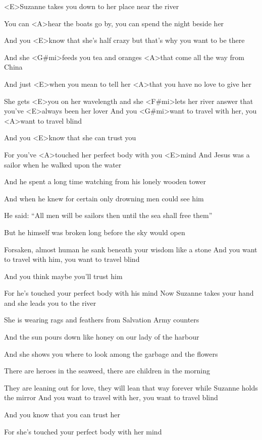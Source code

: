 
\zs
<E>Suzanne takes you down to her place near the river

You can <A>hear the boats go by, you can spend the night beside her

And you <E>know that she's half crazy but that's why you want to be there

And she <G#mi>feeds you tea and oranges <A>that come all the way from China

And just <E>when you mean to tell her <A>that you have no love to give her

She gets <E>you on her wavelength and she <F#mi>lets her river answer that you've <E>always been her lover
\ks
\zr
And you <G#mi>want to travel with her, you <A>want to travel blind

And you <E>know that she can trust you 

For you've <A>touched her perfect body with you <E>mind
\kr
\zs
And Jesus was a sailor when he walked upon the water

And he spent a long time watching from his lonely wooden tower

And when he knew for certain only drowning men could see him

He said: ``All men will be sailors then until the sea shall free them''

But he himself was broken long before the sky would open

Forsaken, almost human he sank beneath your wisdom like a stone
\ks
\zr
And you want to travel with him, you want to travel blind

And you think maybe you'll trust him

For he's touched your perfect body with his mind
\kr
\zs
Now Suzanne takes your hand and she leads you to the river

She is wearing rags and feathers from Salvation Army counters

And the sun pours down like honey on our lady of the harbour

And she shows you where to look among the garbage and the flowers

There are heroes in the seaweed, there are children in the morning

They are leaning out for love, they will lean that way forever while Suzanne holds the mirror
\ks
\zr
And you want to travel with her, you want to travel blind

And you know that you can trust her

For she's touched your perfect body with her mind
\kr
\kp
